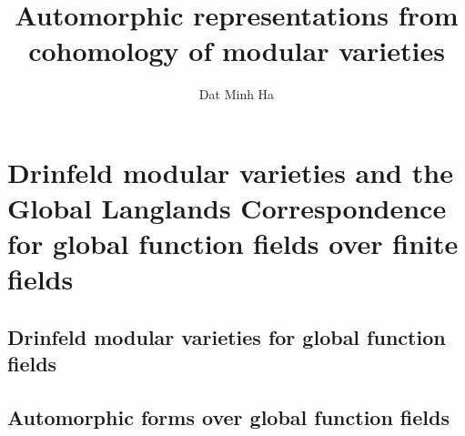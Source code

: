 

\setcounter{section}{-1}





	\title{Automorphic representations from cohomology of modular varieties}
	
	\author{Dat Minh Ha}
	\maketitle
	
	\begin{abstract}
	    
	\end{abstract}
	
	{
      \hypersetup{} 
      \dominitoc
      \tableofcontents %
    }
    
    \part{Drinfeld modular varieties and the Global Langlands Correspondence for global function fields over finite fields}
        \chapter{Drinfeld modular varieties for global function fields}
            \begin{abstract}
                
            \end{abstract}
            
            \minitoc
            
            
            
            
            
            
            
            
            
        \chapter{Automorphic forms over global function fields}
        
